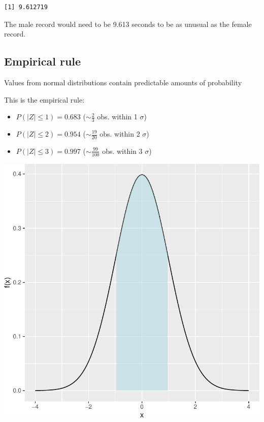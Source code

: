 \documentclass[
  letterpaper,
  DIV=11,
  numbers=noendperiod]{scrartcl}
\providecommand{\tightlist}{%
  \setlength{\itemsep}{0pt}\setlength{\parskip}{0pt}}
\begin{document}
\begin{verbatim}
[1] 9.612719
\end{verbatim}

The male record would need to be 9.613 seconds to be as unusual as the
female record.

\subsection{Empirical rule}\label{empirical-rule}

Values from normal distributions contain predictable amounts of
probability

This is the {empirical rule:}

\begin{itemize}
\tightlist
\item
  {\(P( |Z| \leq 1) = 0.683\)} (\(\sim \frac{2}{3}\) obs. within 1
  \(\sigma\))
\item
  {\(P( |Z| \leq 2) = 0.954\)} (\(\sim \frac{19}{20}\) obs. within 2
  \(\sigma\))
\item
  {\(P( |Z| \leq 3) = 0.997\)} (\(\sim \frac{99}{100}\) obs. within 3
  \(\sigma\))
\end{itemize}

\includegraphics[width=1.1\linewidth,height=\textheight,keepaspectratio]{chapter3normal_files/figure-pdf/normalEmpRuleGeneral1-1.pdf}
\end{document}
